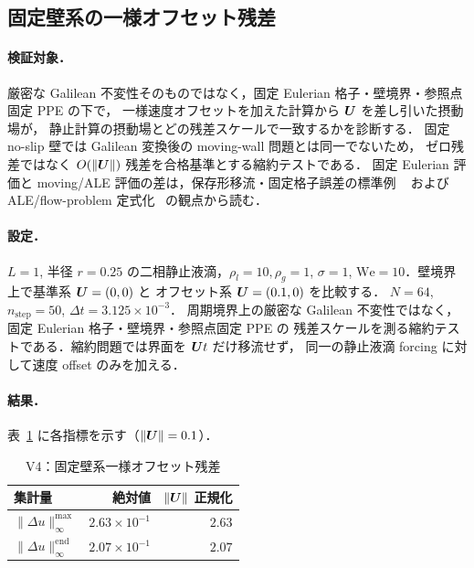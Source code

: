 %
\subsection{固定壁系の一様オフセット残差}
\label{sec:galilean_offset}

\paragraph{検証対象．}
厳密な Galilean 不変性そのものではなく，固定 Eulerian 格子・壁境界・参照点固定 PPE の下で，
一様速度オフセットを加えた計算から $\bm{U}$ を差し引いた摂動場が，
静止計算の摂動場とどの残差スケールで一致するかを診断する．
固定 no-slip 壁では Galilean 変換後の moving-wall 問題とは同一でないため，
ゼロ残差ではなく $O(\|\bm{U}\|)$ 残差を合格基準とする縮約テストである．
固定 Eulerian 評価と moving/ALE 評価の差は，保存形移流・固定格子誤差の標準例
~\cite{LeVeque1996} および ALE/flow-problem 定式化~\cite{DoneaHuerta2003}
の観点から読む．

\paragraph{設定．}
$L=1$, 半径 $r=0.25$ の二相静止液滴，$\rho_l=10, \rho_g=1$,
$\sigma=1$, $\mathrm{We}=10$．壁境界上で基準系 $\bm{U}=(0,0)$ と
オフセット系 $\bm{U}=(0.1,0)$ を比較する．
$N = 64$, $n_{\mathrm{step}} = 50$, $\Delta t = 3.125\times 10^{-3}$．
周期境界上の厳密な Galilean 不変性ではなく，固定 Eulerian 格子・壁境界・参照点固定 PPE の
残差スケールを測る縮約テストである．縮約問題では界面を $\bm{U} t$ だけ移流せず，
同一の静止液滴 forcing に対して速度 offset のみを加える．

\paragraph{結果．}
表~\ref{tab:V4_galilean} に各指標を示す（$\|\bm{U}\| = 0.1$）．

\begin{table}[!ht]
\caption{V4：固定壁系一様オフセット残差}
\label{tab:V4_galilean}
\centering\small
\begin{tabular}{l r r}
\toprule
集計量 & 絶対値 & $\|\bm{U}\|$ 正規化 \\
\midrule
$\|\Delta u\|_\infty^{\max}$           & $2.63\times 10^{-1}$ & $2.63$ \\
$\|\Delta u\|_\infty^{\mathrm{end}}$   & $2.07\times 10^{-1}$ & $2.07$ \\
\bottomrule
\end{tabular}
\end{table}

